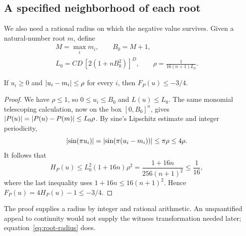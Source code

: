 \subsection{A specified neighborhood of each root}

We also need a rational radius on which the negative value survives. Given
a natural-number root $m$, define
\begin{equation}
 \begin{gathered}
 M=\max_i m_i,\qquad B_0=M+1,\\
 L_0=CD\,[2(1+nB_0^2)]^D,
 \qquad \rho=\frac{1}{16(n+1)L_0}.
 \end{gathered}\label{eq:root-radius}
\end{equation}

\begin{lemma}\label{lem:root-neighborhood}
If $u_i\ge0$ and $\left|u_i-m_i\right|\le\rho$ for every $i$, then
$F_P(u)\le-3/4$.
\end{lemma}

\begin{proof}
We have $\rho\le1$, so $0\le u_i\le B_0$ and $L(u)\le L_0$.
The same monomial telescoping calculation, now on the box $[0,B_0]^n$,
gives $\left|P(u)\right|=\left|P(u)-P(m)\right|\le L_0\rho$.
By sine's Lipschitz estimate and integer periodicity,
\[
 \left|\sin(\pi u_i)\right|
 =\left|\sin(\pi(u_i-m_i))\right|\le\pi\rho\le4\rho.
\]
It follows that
\[
 H_P(u)\le L_0^2(1+16n)\rho^2
 =\frac{1+16n}{256(n+1)^2}\le\frac1{16},
\]
where the last inequality uses $1+16n\le16(n+1)^2$. Hence
$F_P(u)=4H_P(u)-1\le-3/4$.
\end{proof}

The proof supplies a radius by integer and rational arithmetic. An
unquantified appeal to continuity would not supply the witness transformation
needed later; equation~\eqref{eq:root-radius} does.
